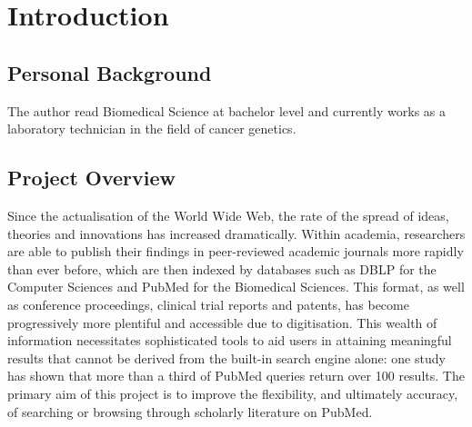 \documentclass[PROP_AGutteridge_CS.tex]{subfiles}
\begin{document}
\chapter{Introduction}
\section{Personal Background}
The author read Biomedical Science at bachelor level and currently works as a laboratory technician in the field of cancer genetics.

\section{Project Overview}
Since the actualisation of the World Wide Web, the rate of the spread of ideas, theories and innovations has increased dramatically. Within academia, researchers are able to publish their findings in peer-reviewed academic journals more rapidly than ever before, which are then indexed by databases such as DBLP for the Computer Sciences and PubMed for the Biomedical Sciences. This format, as well as conference proceedings, clinical trial reports and patents, has become progressively more plentiful and accessible due to digitisation. This wealth of information necessitates sophisticated tools to aid users in attaining meaningful results that cannot be derived from the built-in search engine alone: one study has shown that more than a third of PubMed queries return over 100 results\cite{dogan}. The primary aim of this project is to improve the flexibility, and ultimately accuracy, of searching or browsing through scholarly literature on PubMed.
\end{document}
